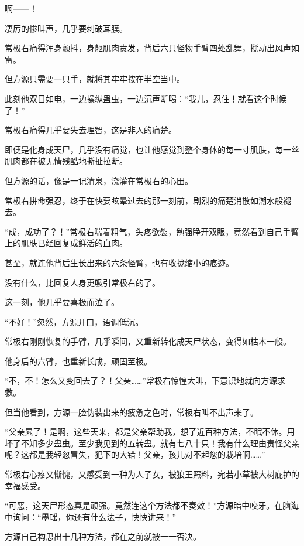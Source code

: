 
\begin{this_body}



啊——！

凄厉的惨叫声，几乎要刺破耳膜。

常极右痛得浑身颤抖，身躯肌肉贲发，背后六只怪物手臂四处乱舞，搅动出风声如雷。

但方源只需要一只手，就将其牢牢按在半空当中。

此刻他双目如电，一边操纵蛊虫，一边沉声断喝：“我儿，忍住！就看这个时候了！”

常极右痛得几乎要失去理智，这是非人的痛楚。

即便是化身成天尸，几乎没有痛觉，也让他感觉到整个身体的每一寸肌肤，每一丝肌肉都在被无情残酷地撕扯拉断。

但方源的话，像是一记清泉，浇灌在常极右的心田。

常极右拼命强忍，终于在快要眩晕过去的那一刻前，剧烈的痛楚消散如潮水般褪去。

“成，成功了？！”常极右喘着粗气，头疼欲裂，勉强睁开双眼，竟然看到自己手臂上的肌肤已经回复成鲜活的血肉。

甚至，就连他背后生长出来的六条怪臂，也有收拢缩小的痕迹。

没有什么，比回复人身更吸引常极右的了。

这一刻，他几乎要喜极而泣了。

“不好！”忽然，方源开口，语调低沉。

常极右刚刚恢复的手臂，几乎瞬间，又重新转化成天尸状态，变得如枯木一般。

他身后的六臂，也重新长成，顽固至极。

“不，不！怎么又变回去了？！父亲……”常极右惊惶大叫，下意识地就向方源求救。

但当他看到，方源一脸伪装出来的疲惫之色时，常极右叫不出声来了。

“父亲累了！是啊，这些天来，都是父亲帮助我，想了近百种方法，不眠不休。用坏了不知多少蛊虫。至少我见到的五转蛊。就有七八十只！我有什么理由责怪父亲呢？这都是我轻忽冒失，犯下的大错！父亲，孩儿对不起您的栽培啊……”

常极右心疼又惭愧，又感受到一种为人子女，被狼王照料，宛若小草被大树庇护的幸福感受。

“可恶，这天尸形态真是顽强。竟然连这个方法都不奏效！”方源暗中咬牙。在脑海中询问：“墨瑶，你还有什么法子，快快讲来！”

方源自己构思出十几种方法，都在之前就被一一否决。


\end{this_body}
